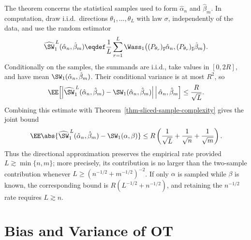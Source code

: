 \begin{rem}\label{rem-sliced-direction-sample-budget}
	The theorem concerns the statistical samples used to form \(\hat\alpha_n\) and \(\hat\beta_m\). In computation, draw i.i.d.\ directions \(\theta_1,\ldots,\theta_L\) with law \(\sigma\), independently of the data, and use the random estimator
	\begin{equation}\label{eq-empirical-direction-sliced-w1}
		\widehat{\SW}_1^{\,L}(\hat\alpha_n,\hat\beta_m)
		\eqdef
		\frac1L\sum_{r=1}^L
		\Wass_1\big((P_{\theta_r})_\sharp\hat\alpha_n,
		(P_{\theta_r})_\sharp\hat\beta_m\big).
	\end{equation}
	Conditionally on the samples, the summands are i.i.d., take values in \([0,2R]\), and have mean \(\SW_1(\hat\alpha_n,\hat\beta_m)\). Their conditional variance is at most \(R^2\), so
	\[
		\EE\!\left[
		\left|
		\widehat{\SW}_1^{\,L}(\hat\alpha_n,\hat\beta_m)
		-\SW_1(\hat\alpha_n,\hat\beta_m)
		\right|
		\,\middle|\,\hat\alpha_n,\hat\beta_m
		\right]
		\leq
		\frac{R}{\sqrt L}.
	\]
	Combining this estimate with Theorem~\ref{thm-sliced-sample-complexity} gives the joint bound
	\begin{equation}\label{eq-sliced-joint-sample-direction-rate}
		\EE\abs{
		\widehat{\SW}_1^{\,L}(\hat\alpha_n,\hat\beta_m)
		-\SW_1(\alpha,\beta)}
		\leq
		R\left(\frac1{\sqrt L}+\frac1{\sqrt n}+\frac1{\sqrt m}\right).
	\end{equation}
	Thus the directional approximation preserves the empirical rate provided
	\(L\gtrsim\min\{n,m\}\); more precisely, its contribution is no larger than the two-sample contribution whenever
	\(L\geq(n^{-1/2}+m^{-1/2})^{-2}\).
	If only \(\alpha\) is sampled while \(\beta\) is known, the corresponding bound is
	\(R(L^{-1/2}+n^{-1/2})\), and retaining the \(n^{-1/2}\) rate requires \(L\gtrsim n\).
\end{rem}

\section{Bias and Variance of OT}
\label{sec-bias-variance-ot}

